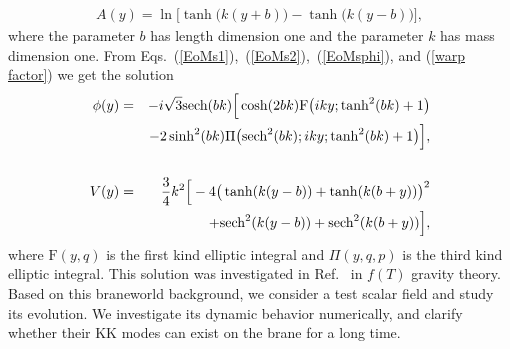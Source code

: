 \begin{eqnarray}
A(y)=\ln\Big[\tanh\big(k(y+b)\big)-\tanh \big(k(y-b)\big)\Big],\label{warp factor}
\end{eqnarray}
where the parameter $b$ has length dimension one and the parameter $k$ has mass dimension one. From Eqs.~(\ref{EoMs1}),~(\ref{EoMs2}),~(\ref{EoMsphi}), and (\ref{warp factor}) we get the solution
\begin{eqnarray}
\phi(y)&=&-i \sqrt{3} \text{sech}(b k)\Big[\cosh (2 b k) \text{F}\big(i k y;\tanh ^2(b k)+1\big)\nonumber\\
&&-2 \sinh ^2(b k) {\rm \Pi} \big(\text{sech}^2(b k);i k y;\tanh ^2(b k)+1\big)\Big],\label{grscalar}\nonumber\\ \\
V(y)&=&\frac{3}{4} k^2 \Big[-4 \big(\tanh (k (y-b))+\tanh (k (b+y))\big)^2\nonumber\\
&&+\text{sech}^2(k (y-b))+\text{sech}^2(k (b+y))\Big],
\end{eqnarray}
where $\text{F}(y,q)$ is the first kind elliptic integral and $\Pi(y,q,p)$ is the third kind elliptic integral. This solution was investigated in Ref.~\cite{Tan:2020sys} in $f(T)$ gravity theory. Based on this braneworld background, we consider a test scalar field and study its evolution. We investigate its dynamic behavior numerically, and clarify whether their KK modes can exist on the brane for a long time.



